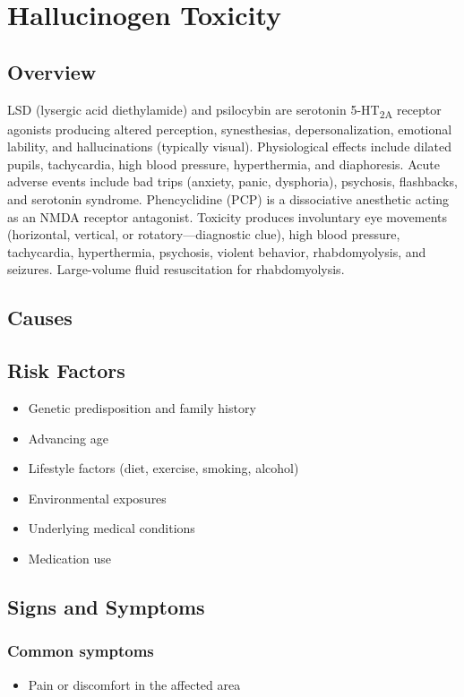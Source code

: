 \chapter{Hallucinogen Toxicity}
\label{sec:Hallucinogen Toxicity}

\section{Overview}
LSD (lysergic acid diethylamide) and psilocybin are serotonin 5-HT\textsubscript{2A} receptor agonists producing altered perception, synesthesias, depersonalization, emotional lability, and hallucinations (typically visual). Physiological effects include dilated pupils, tachycardia, high blood pressure, hyperthermia, and diaphoresis. Acute adverse events include bad trips (anxiety, panic, dysphoria), psychosis, flashbacks, and serotonin syndrome. Phencyclidine (PCP) is a dissociative anesthetic acting as an NMDA receptor antagonist. Toxicity produces involuntary eye movements (horizontal, vertical, or rotatory---diagnostic clue), high blood pressure, tachycardia, hyperthermia, psychosis, violent behavior, rhabdomyolysis, and seizures. Large-volume fluid resuscitation for rhabdomyolysis.
\section{Causes}
\section{Risk Factors}

\begin{itemize}[noitemsep]
  \item Genetic predisposition and family history
  \item Advancing age
  \item Lifestyle factors (diet, exercise, smoking, alcohol)
  \item Environmental exposures
  \item Underlying medical conditions
  \item Medication use
\end{itemize}
\section{Signs and Symptoms}

\subsection{Common symptoms}
\begin{itemize}[noitemsep]
  \item Pain or discomfort in the affected area
  \end{itemize}

